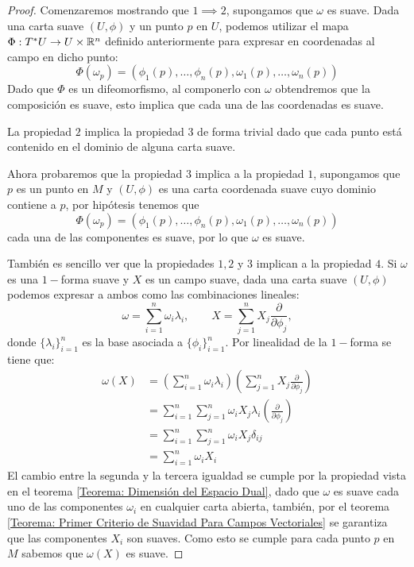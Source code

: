 \begin{proof}
	Comenzaremos mostrando que $1 \implies 2$, supongamos que $\omega$ es suave. Dada una carta suave $(U, \phi)$ y un punto $p$ en $U$, podemos utilizar el mapa $\Phi: T^{*}U \to U \times \mathbb{R}^n$ definido anteriormente para expresar en coordenadas al campo en dicho punto:
	\[
		\Phi(\omega_p) = (\phi_1(p), \ldots,\phi_n(p), \omega_1(p), \ldots, \omega_n(p))
	\]
	Dado que $\Phi$ es un difeomorfismo, al componerlo con $\omega$ obtendremos que la composición es suave, esto implica que cada una de las coordenadas es suave.

	La propiedad $2$ implica la propiedad $3$ de forma trivial dado que cada punto está contenido en el dominio de alguna carta suave.

	Ahora probaremos que la propiedad $3$ implica a la propiedad $1$, supongamos que $p$ es un punto en $M$ y $(U,\phi)$ es una carta coordenada suave cuyo dominio contiene a $p$, por hipótesis tenemos que
	\[
		\Phi(\omega_p) = (\phi_1(p), \ldots,\phi_n(p), \omega_1(p), \ldots, \omega_n(p))
	\]
	cada una de las componentes es suave, por lo que $\omega$ es suave.

	También es sencillo ver que la propiedades $1, 2$ y $3$ implican a la propiedad $4$. Si $\omega$ es una $1-$forma suave y $X$ es un campo suave, dada una carta suave $(U,\phi)$ podemos expresar a ambos como las combinaciones lineales:
	\[
		\omega = \sum_{i=1}^{n} \omega_i \lambda_i,
		\quad \quad
		X = \sum_{j=1}^{n} X_j \frac{\partial}{\partial \phi_j},
	\]
	donde $\{\lambda_i\}_{i=1}^{n}$ es la base asociada a $\{\phi_i\}_{i=1}^n$. Por linealidad de la $1-$forma se tiene que:
	\begin{align*}
		\omega(X) & =
		\left(\sum_{i=1}^{n} \omega_i \lambda_i\right)
		\left(\sum_{j=1}^{n} X_j \frac{\partial}{\partial \phi_j}\right)     \\
		          & =
		\sum_{i=1}^{n} \sum_{j=1}^{n}
		\omega_i X_j \lambda_i \left(\frac{\partial}{\partial \phi_j}\right) \\
		          & =
		\sum_{i=1}^{n} \sum_{j=1}^{n}
		\omega_i X_j \delta_{ij}                                             \\
		          & =
		\sum_{i=1}^{n} \omega_i X_i
	\end{align*}
	El cambio entre la segunda y la tercera igualdad se cumple por la propiedad vista en el teorema \ref{Teorema: Dimensión del Espacio Dual}, dado que $\omega$ es suave cada uno de las componentes $\omega_i$ en cualquier carta abierta, también, por el teorema \ref{Teorema: Primer Criterio de Suavidad Para Campos Vectoriales} se garantiza que las componentes $X_i$ son suaves. Como esto se cumple para cada punto $p$ en $M$ sabemos que $\omega(X)$ es suave.


\end{proof}
